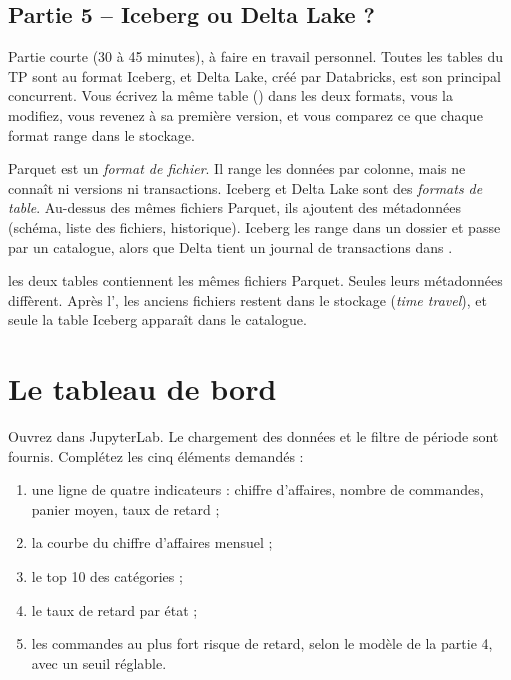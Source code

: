 \subsection*{Partie 5 -- Iceberg ou Delta Lake ? \hfill {}}

Partie courte (30 à 45 minutes), à faire en travail personnel. Toutes les
tables du TP sont au format Iceberg, et Delta Lake, créé par Databricks, est son principal concurrent.
Vous écrivez la même table () dans les deux formats, vous la modifiez, vous
revenez à sa première version, et vous comparez ce que chaque format range dans le stockage.

\begin{notion}
Parquet est un \emph{format de fichier}. Il range les
données par colonne, mais ne connaît ni versions ni transactions. Iceberg et Delta Lake sont des
\emph{formats de table}. Au-dessus des mêmes fichiers Parquet, ils ajoutent des métadonnées (schéma,
liste des fichiers, historique). Iceberg les range dans un dossier  et passe par un
catalogue, alors que Delta tient un journal de transactions dans .
\end{notion}

\begin{resultat}
les deux tables contiennent les mêmes fichiers Parquet. Seules leurs métadonnées diffèrent. Après
l', les anciens fichiers restent dans le stockage (\emph{time travel}), et seule la table
Iceberg apparaît dans le catalogue.
\end{resultat}


\section{Le tableau de bord}\label{c3:sec:dashboard}

Ouvrez  dans JupyterLab. Le chargement des données et le filtre de période
sont fournis. Complétez les cinq éléments demandés :

\begin{enumerate}[leftmargin=*,nosep]
  \item une ligne de quatre indicateurs : chiffre d'affaires, nombre de commandes, panier moyen, taux de retard ;
  \item la courbe du chiffre d'affaires mensuel ;
  \item le top 10 des catégories ;
  \item le taux de retard par état ;
  \item les commandes au plus fort risque de retard, selon le modèle de la partie 4, avec un seuil réglable.
\end{enumerate}

